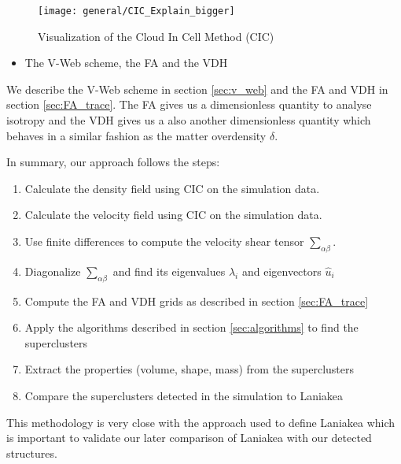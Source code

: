 \documentclass[12pt]{article}
\begin{document}
\begin{figure}[ht]
\begin{center}
\texttt{[image: general/CIC\_Explain\_bigger]} %
\caption{Visualization of the Cloud In Cell Method (CIC)}
\label{fg:cic_explain}
\end{center}
\end{figure}
\FloatBarrier

\begin{itemize}
\item The V-Web scheme, the FA and the VDH
\end{itemize}
\begin{par}
We describe the V-Web scheme in section \ref{sec:v_web}
 and the FA and VDH in section \ref{sec:FA_trace}.
The FA gives us a dimensionless quantity to analyse
 isotropy and the VDH gives us a also another
  dimensionless quantity which behaves in a similar
   fashion as the matter overdensity $\delta$.
\end{par}


\begin{par}
In summary, our approach follows the steps:
\end{par}

\begin{enumerate}
\item Calculate the density field using CIC on the simulation data.
\item Calculate the velocity field using CIC on the simulation data.
\item Use finite differences to compute the velocity shear tensor $\sum_{\alpha \beta}$.
\item Diagonalize $\sum_{\alpha \beta}$ and find its eigenvalues $\lambda_i$ and eigenvectors $\hat{u}_i$
\item Compute the FA and VDH grids as described in section \ref{sec:FA_trace} 
\item Apply the algorithms described in section \ref{sec:algorithms} to find the superclusters
\item Extract the properties (volume, shape, mass) from the superclusters
\item Compare the superclusters detected in the simulation to Laniakea
\end{enumerate}


\begin{par}
This methodology is very close with the approach
 used to define Laniakea
  \cite{tully_laniakea_2014} which is important to
   validate our later comparison of Laniakea with
    our detected structures.
\end{par}
\end{document}
